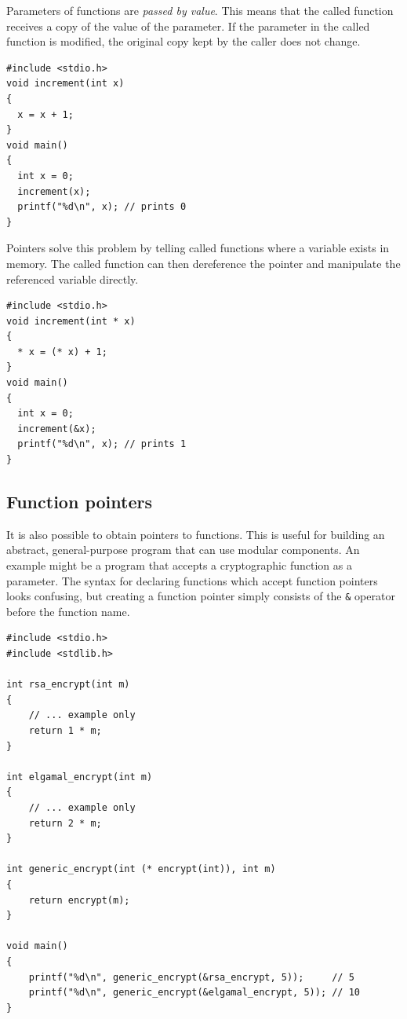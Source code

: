 \documentclass{book}
\begin{document}
Parameters of functions are \textit{passed by value}. This means that the called function receives a copy of the value of the parameter. If the parameter in the called function is modified, the original copy kept by the caller does not change. 

\begin{lstlisting}[caption={Passing the value of a variable to a function}, captionpos=b, mathescape, xleftmargin=.25in, xrightmargin=.25in]
#include <stdio.h>
void increment(int x)
{
  x = x + 1;
}
void main()
{
  int x = 0;
  increment(x);
  printf("%d\n", x); // prints 0
}
\end{lstlisting}

Pointers solve this problem by telling called functions where a variable exists in memory. The called function can then dereference the pointer and manipulate the referenced variable directly.

\begin{lstlisting}[caption={Passing a pointer to a variable to a function}, captionpos=b, mathescape, xleftmargin=.25in, xrightmargin=.25in]
#include <stdio.h>
void increment(int * x)
{
  * x = (* x) + 1;
}
void main()
{
  int x = 0;
  increment(&x);
  printf("%d\n", x); // prints 1
}
\end{lstlisting}

\subsection{Function pointers}

It is also possible to obtain pointers to functions. This is useful for building an abstract, general-purpose program that can use modular components. An example might be a program that accepts a cryptographic function as a parameter. The syntax for declaring functions which accept function pointers looks confusing, but creating a function pointer simply consists of the \texttt{\&} operator before the function name.

\begin{lstlisting}[caption={Function pointers abstract an algorithm from its components}, captionpos=b, mathescape, xleftmargin=.25in, xrightmargin=.25in]
#include <stdio.h>
#include <stdlib.h>

int rsa_encrypt(int m)
{
    // ... example only
    return 1 * m;
}

int elgamal_encrypt(int m)
{
    // ... example only
    return 2 * m;
}

int generic_encrypt(int (* encrypt(int)), int m)
{
    return encrypt(m);
}

void main()
{
    printf("%d\n", generic_encrypt(&rsa_encrypt, 5));     // 5
    printf("%d\n", generic_encrypt(&elgamal_encrypt, 5)); // 10
}
\end{lstlisting}
\end{document}
